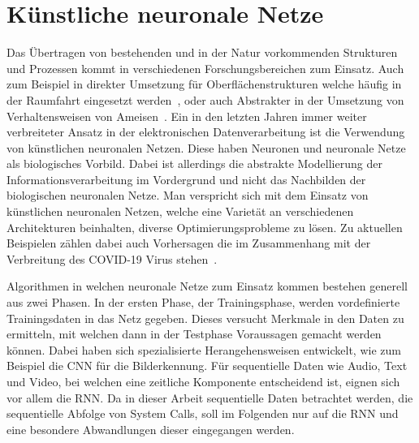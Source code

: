     \section{Künstliche neuronale Netze}\label{sec:KNN}        
        Das Übertragen von bestehenden und in der Natur vorkommenden Strukturen und Prozessen kommt in verschiedenen Forschungsbereichen zum Einsatz.
        Auch zum Beispiel in direkter Umsetzung für Oberflächenstrukturen welche häufig in der Raumfahrt eingesetzt werden~\cite{GECKO}, oder auch Abstrakter in der Umsetzung von Verhaltensweisen von Ameisen~\cite{ANT}.
        Ein in den letzten Jahren immer weiter verbreiteter Ansatz in der elektronischen Datenverarbeitung ist die Verwendung von künstlichen neuronalen Netzen.
        Diese haben Neuronen und neuronale Netze als biologisches Vorbild.
        Dabei ist allerdings die abstrakte Modellierung der Informationsverarbeitung im Vordergrund und nicht das Nachbilden der biologischen neuronalen Netze.
        Man verspricht sich mit dem Einsatz von künstlichen neuronalen Netzen, welche eine Varietät an verschiedenen Architekturen beinhalten, diverse Optimierungsprobleme zu lösen.
        Zu aktuellen Beispielen zählen dabei auch Vorhersagen die im Zusammenhang mit der Verbreitung des COVID-19 Virus stehen~\cite{COVID1, COVID2, COVID3}.
        
        Algorithmen in welchen neuronale Netze zum Einsatz kommen bestehen generell aus zwei Phasen. 
        In der ersten Phase, der Trainingsphase, werden vordefinierte Trainingsdaten in das Netz gegeben.
        Dieses versucht Merkmale in den Daten zu ermitteln, mit welchen dann in der Testphase Voraussagen gemacht werden können.
        Dabei haben sich spezialisierte Herangehensweisen entwickelt, wie zum Beispiel die \ac{CNN} für die Bilderkennung. 
        Für sequentielle Daten wie Audio, Text und Video, bei welchen eine zeitliche Komponente entscheidend ist, eignen sich vor allem die \ac{RNN}.
        Da in dieser Arbeit sequentielle Daten betrachtet werden, die sequentielle Abfolge von System Calls, soll im Folgenden nur auf die \ac{RNN} und eine besondere Abwandlungen dieser eingegangen werden.
